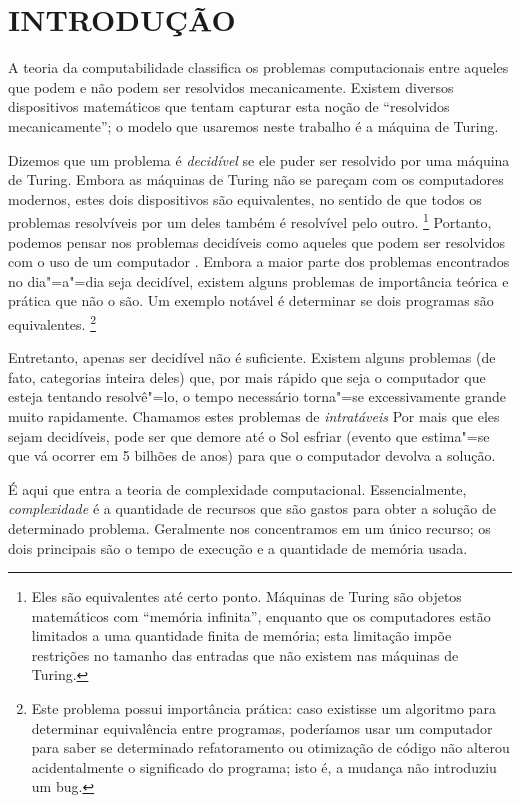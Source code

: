 \chapter{INTRODUÇÃO}

A teoria da computabilidade
classifica os problemas computacionais entre
aqueles que podem e não podem ser resolvidos mecanicamente.
Existem diversos dispositivos matemáticos
que tentam capturar esta noção de
``resolvidos mecanicamente'';
o modelo que usaremos neste trabalho é a máquina de Turing.

Dizemos que um problema é \emph{decidível}
se ele puder ser resolvido por uma máquina de Turing.
Embora as máquinas de Turing
não se pareçam com os computadores modernos,
estes dois dispositivos são equivalentes,
no sentido de que
todos os problemas resolvíveis por um deles
também é resolvível pelo outro.
\footnote{
    Eles são equivalentes até certo ponto.
    Máquinas de Turing são objetos matemáticos
    com ``memória infinita'',
    enquanto que os computadores estão limitados
    a uma quantidade finita de memória;
    esta limitação impõe restrições no tamanho das entradas
    que não existem nas máquinas de Turing.
}
Portanto, podemos pensar nos problemas decidíveis
como aqueles que podem ser resolvidos com o uso de um computador
\cite[p.~307]{HopcroftMotwaniUllman2001}.
Embora a maior parte dos problemas
encontrados no dia"=a"=dia seja decidível,
existem alguns problemas de importância teórica e prática
que não o são.
Um exemplo notável é determinar se dois programas são equivalentes.
\footnote{
    Este problema possui importância prática:
    caso existisse um algoritmo para determinar equivalência entre programas,
    poderíamos usar um computador para saber se
    determinado refatoramento ou otimização de código
    não alterou acidentalmente o significado do programa;
    isto é, a mudança não introduziu um bug.
}

Entretanto,
apenas ser decidível não é suficiente.
Existem alguns problemas
(de fato, categorias inteira deles)
que, por mais rápido que seja o computador
que esteja tentando resolvê"=lo,
o tempo necessário torna"=se excessivamente grande
muito rapidamente.
Chamamos estes problemas de \emph{intratáveis}
\cite[p.~1]{HopcroftMotwaniUllman2001}
Por mais que eles sejam decidíveis,
pode ser que demore até o Sol esfriar
(evento que estima"=se que vá ocorrer em 5 bilhões de anos)
para que o computador devolva a solução.

É aqui que entra a teoria de complexidade computacional.
Essencialmente,
\emph{complexidade}
é a quantidade de recursos que são gastos
para obter a solução de determinado problema.
Geralmente nos concentramos em um único recurso;
os dois principais são
o tempo de execução e a quantidade de memória usada.

